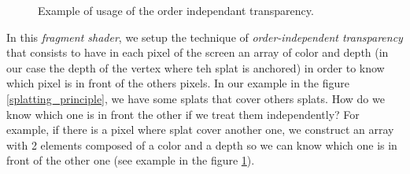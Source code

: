 \begin{figure}
    \begin{center}
    \end{center}
    \caption{Example of usage of the order independant transparency.}
    \label{order}
\end{figure}

In this \textit{fragment shader}, we setup the technique of \textit{order-independent transparency} that consists to have in each pixel of the screen an array of color and depth (in our case the depth of the vertex where teh splat is anchored) in order to know which pixel is in front of the others pixels. In our example in the figure \ref{splatting_principle}, we have some splats that cover others splats. How do we know which one is in front the other if we treat them independently? For example, if there is a pixel where splat cover another one, we construct an array with 2 elements composed of a color and a depth so we can know which one is in front of the other one (see example in the figure \ref{order}).
